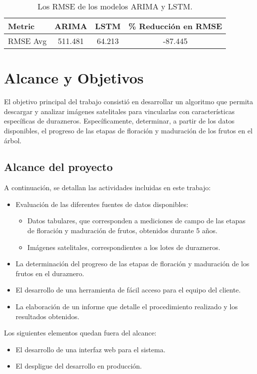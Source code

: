 \begin{table}[h]
	\centering
	\caption{Los RMSE de los modelos ARIMA y LSTM.}
	\begin{tabular}{l c c c}    
		\toprule
		\textbf{Metric} & \textbf{ARIMA} & \textbf{LSTM} & \textbf{\% Reducción en RMSE} \\
		\midrule
		RMSE Avg & 511.481  & 64.213  & -87.445 \\		
		\bottomrule
	\end{tabular}
	\label{tab:rmse}
\end{table}

\section{Alcance y Objetivos}
El objetivo principal del trabajo consistió en desarrollar un algoritmo que permita descargar y analizar 
imágenes satelitales para vincularlas con características específicas de durazneros. Específicamente, 
determinar, a partir de los datos disponibles, el progreso de las etapas de floración y maduración de 
los frutos en el árbol.

\subsection{Alcance del proyecto}
A continuación, se detallan las actividades incluidas en este trabajo:

\begin{itemize}
  \item Evaluación de las diferentes fuentes de datos disponibles:
  \begin{itemize}
    \item Datos tabulares, que corresponden a mediciones de campo
    de las etapas de floración y maduración de frutos, obtenidos durante 5
    años.
    \item Imágenes satelitales, correspondientes a los lotes de durazneros.
    \end{itemize}
  \item La determinación del progreso de las etapas de floración y maduración de
  los frutos en el duraznero.
  \item El desarrollo de una herramienta de fácil acceso para el equipo del cliente.
  \item La elaboración de un informe que detalle el procedimiento realizado y los resultados obtenidos.  
  \end{itemize}

  Los siguientes elementos quedan fuera del alcance:
  \begin{itemize}
    \item El desarrollo de una interfaz web para el sistema.
    \item El despligue del desarrollo en producción.
    \end{itemize}

